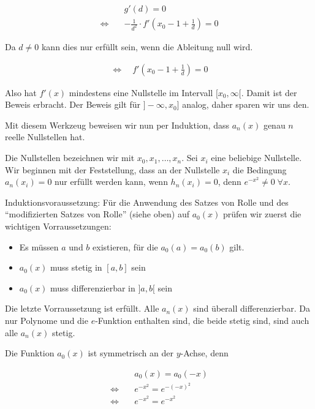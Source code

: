 \documentclass[a4paper,german,12pt,smallheadings]{scrartcl}
\begin{document}
\begin{align*}
  &g'(d) = 0 \\
  \Leftrightarrow\quad&-\frac{1}{d^2} \cdot f'\left(x_0 - 1 + \frac{1}{d}\right) = 0
\end{align*}

Da $d \neq 0$ kann dies nur erfüllt sein, wenn die Ableitung null wird.

\begin{align*}
  \Leftrightarrow\quad f'\left(x_0 - 1 + \frac{1}{d}\right) = 0
\end{align*}

Also hat $f'(x)$ mindestens eine Nullstelle im Intervall $[x_0, \infty[$. Damit
ist der Beweis erbracht. Der Beweis gilt für $]-\infty, x_0]$ analog, daher
sparen wir uns den.

Mit diesem Werkzeug beweisen wir nun per Induktion, dass $a_n(x)$ genau $n$
reelle Nullstellen hat.

Die Nullstellen bezeichnen wir mit $x_0, x_1, \dots, x_n$. Sei $x_i$ eine
beliebige Nullstelle. Wir beginnen mit der Feststellung, dass an der Nullstelle
$x_i$ die Bedingung $a_n(x_i) = 0$ nur erfüllt werden kann, wenn $h_n(x_i) =
0$, denn $e^{-x^2} \neq 0\;\forall x$.

Induktionsvoraussetzung: Für die Anwendung des Satzes von Rolle und des
``modifizierten Satzes von Rolle'' (siehe oben) auf $a_0(x)$ prüfen wir zuerst
die wichtigen Vorraussetzungen:

\begin{itemize}
  \item Es müssen $a$ und $b$ existieren, für die $a_0(a) = a_0(b)$ gilt.
  \item $a_0(x)$ muss stetig in $[a,b]$ sein
  \item $a_0(x)$ muss differenzierbar in $]a,b[$ sein
\end{itemize}

Die letzte Vorraussetzung ist erfüllt. Alle $a_n(x)$ sind überall
differenzierbar. Da nur Polynome und die $e$-Funktion enthalten sind, die beide
stetig sind, sind auch alle $a_n(x)$ stetig.

Die Funktion $a_0(x)$ ist symmetrisch an der $y$-Achse, denn

\begin{align*}
  &a_0(x) = a_0(-x) \\
  \Leftrightarrow\quad &e^{-x^2} = e^{-(-x)^2} \\
  \Leftrightarrow\quad &e^{-x^2} = e^{-x^2}
\end{align*}
\end{document}
